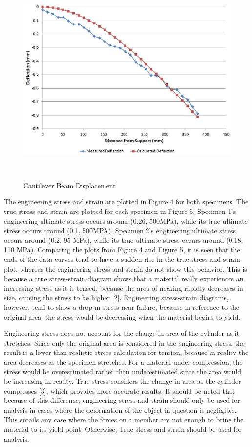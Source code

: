 \documentclass[12pt]{article}
\begin{document}
\newpage

\begin{figure}[h!]  
  \centering
    \includegraphics[width=\linewidth,height=4.2in]{cantilever_deflection.JPG}
    \caption{Cantilever Beam Displacement}
\end{figure}
\bigskip

The engineering stress and strain are plotted in Figure 4 for both specimens. The true stress and strain are plotted for each specimen in Figure 5. Specimen 1's engineering ultimate stress occurs around (0.26, 500MPa), while its true ultimate stress occurs around (0.1, 500MPA). Specimen 2's engineering ultimate stress occurs around (0.2, 95 MPa), while its true ultimate stress occurs around (0.18, 110 MPa). Comparing the plots from Figure 4 and Figure 5, it is seen that the ends of the data curves tend to have a sudden rise in the true stress and strain plot, whereas the engineering stress and strain do not show this behavior. This is because a true stress-strain diagram shows that a material really experiences an increasing stress as it is tensed, because the area of necking rapidly decreases in size, causing the stress to be higher [2]. Engineering stress-strain diagrams, however, tend to show a drop in stress near failure, because in reference to the original area, the stress would be decreasing when the material begins to yield.
\bigskip

Engineering stress does not account for the change in area of the cylinder as it stretches. Since only the original area is considered in the engineering stress, the result is a lower-than-realistic stress calculation for tension, because in reality the area decreases as the specimen stretches. For a material under compression, the stress would be overestimated rather than underestimated since the area would be increasing in reality. True stress considers the change in area as the cylinder compresses [3], which provides more accurate results. It should be noted that because of this difference, engineering stress and strain should only be used for analysis in cases where the deformation of the object in question is negligible. This entails any case where the forces on a member are not enough to bring the material to its yield point. Otherwise, True stress and strain should be used for analysis.
\end{document}
